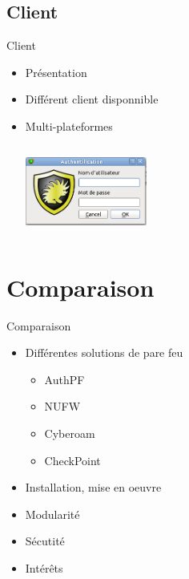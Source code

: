 \documentclass[t,12pt]{beamer}
\begin{document}
	  \subsection{Client}
	  \begin{frame}{Client}                                                         %
	      \begin{itemize}                                                   %
		\item Présentation
		\newline
		\item Différent client disponnible
		\newline
		\item Multi-plateformes
		\newline
		\begin{center}\includegraphics[width=4cm,height=3cm]{images/nuapp.png}\end{center}
	  \end{itemize}
	  \end{frame} 

\section{Comparaison}                                                    %
\begin{frame}{Comparaison}                                                         %
    \begin{itemize}                                                   %
	\item Différentes solutions de pare feu
  \begin{itemize}
    \item AuthPF
    \item NUFW
    \item Cyberoam
    \item CheckPoint
  \end{itemize}
	\pause
	\item Installation, mise en oeuvre
	\item Modularité
  \item Sécutité
  \item Intérêts
\end{itemize}
\end{frame}                                                            %
\end{document}
